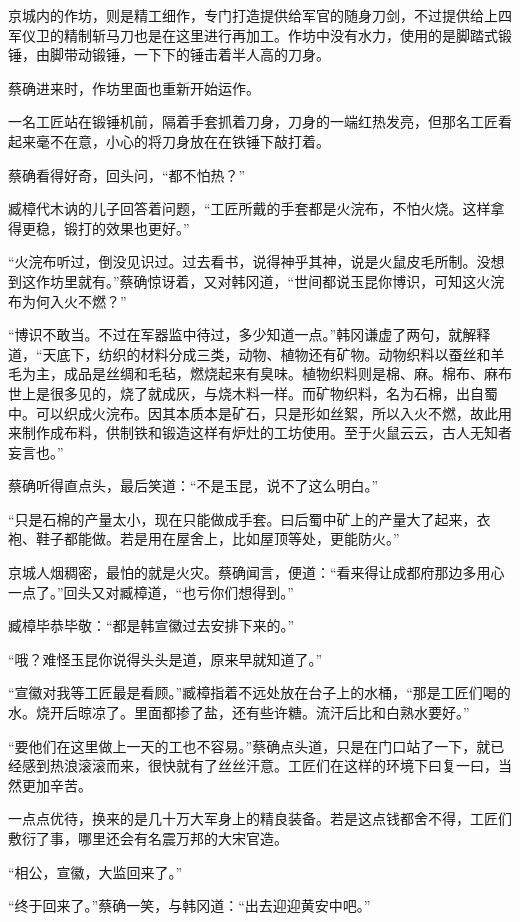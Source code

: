 京城内的作坊，则是精工细作，专门打造提供给军官的随身刀剑，不过提供给上四军仪卫的精制斩马刀也是在这里进行再加工。作坊中没有水力，使用的是脚踏式锻锤，由脚带动锻锤，一下下的锤击着半人高的刀身。

蔡确进来时，作坊里面也重新开始运作。

一名工匠站在锻锤机前，隔着手套抓着刀身，刀身的一端红热发亮，但那名工匠看起来毫不在意，小心的将刀身放在在铁锤下敲打着。

蔡确看得好奇，回头问，“都不怕热？”

臧樟代木讷的儿子回答着问题，“工匠所戴的手套都是火浣布，不怕火烧。这样拿得更稳，锻打的效果也更好。”

“火浣布听过，倒没见识过。过去看书，说得神乎其神，说是火鼠皮毛所制。没想到这作坊里就有。”蔡确惊讶着，又对韩冈道，“世间都说玉昆你博识，可知这火浣布为何入火不燃？”

“博识不敢当。不过在军器监中待过，多少知道一点。”韩冈谦虚了两句，就解释道，“天底下，纺织的材料分成三类，动物、植物还有矿物。动物织料以蚕丝和羊毛为主，成品是丝绸和毛毡，燃烧起来有臭味。植物织料则是棉、麻。棉布、麻布世上是很多见的，烧了就成灰，与烧木料一样。而矿物织料，名为石棉，出自蜀中。可以织成火浣布。因其本质本是矿石，只是形如丝絮，所以入火不燃，故此用来制作成布料，供制铁和锻造这样有炉灶的工坊使用。至于火鼠云云，古人无知者妄言也。”

蔡确听得直点头，最后笑道：“不是玉昆，说不了这么明白。”

“只是石棉的产量太小，现在只能做成手套。曰后蜀中矿上的产量大了起来，衣袍、鞋子都能做。若是用在屋舍上，比如屋顶等处，更能防火。”

京城人烟稠密，最怕的就是火灾。蔡确闻言，便道：“看来得让成都府那边多用心一点了。”回头又对臧樟道，“也亏你们想得到。”

臧樟毕恭毕敬：“都是韩宣徽过去安排下来的。”

“哦？难怪玉昆你说得头头是道，原来早就知道了。”

“宣徽对我等工匠最是看顾。”臧樟指着不远处放在台子上的水桶，“那是工匠们喝的水。烧开后晾凉了。里面都掺了盐，还有些许糖。流汗后比和白熟水要好。”

“要他们在这里做上一天的工也不容易。”蔡确点头道，只是在门口站了一下，就已经感到热浪滚滚而来，很快就有了丝丝汗意。工匠们在这样的环境下曰复一曰，当然更加辛苦。

一点点优待，换来的是几十万大军身上的精良装备。若是这点钱都舍不得，工匠们敷衍了事，哪里还会有名震万邦的大宋官造。

“相公，宣徽，大监回来了。”

“终于回来了。”蔡确一笑，与韩冈道：“出去迎迎黄安中吧。”


